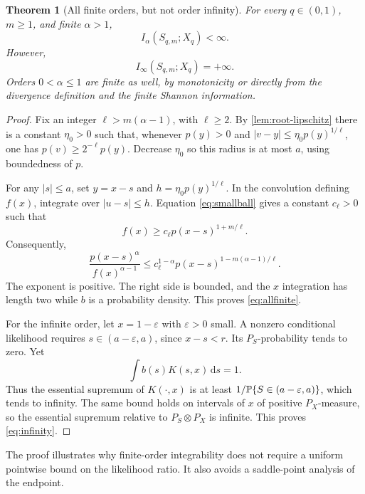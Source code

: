 \documentclass[11pt,a4paper]{article}
\numberwithin{equation}{section}
\newtheorem{theorem}{Theorem}[section]
\theoremstyle{definition}\newtheorem{definition}[theorem]{Definition}
\theoremstyle{remark}\newtheorem{remark}[theorem]{Remark}
\newcommand{\dd}{\,\mathrm d}\newcommand{\ii}{\mathrm i}
\begin{document}
\begin{theorem}[All finite orders, but not order infinity]
\label{thm:all-renyi}
For every $q\in(0,1)$, $m\ge1$, and finite $\alpha>1$,
\begin{equation}
 I_\alpha(S_{q,m};X_q)<\infty.
 \label{eq:allfinite}
\end{equation}
However,
\begin{equation}
 I_\infty(S_{q,m};X_q)=+\infty.
 \label{eq:infinity}
\end{equation}
Orders $0<\alpha\le1$ are finite as well, by monotonicity or directly from the divergence definition and the finite Shannon information.
\end{theorem}
\begin{proof}
Fix an integer $\ell>m(\alpha-1)$, with $\ell\ge2$. By \cref{lem:root-lipschitz} there is a constant $\eta_0>0$ such that, whenever $p(y)>0$ and
$|v-y|\le\eta_0p(y)^{1/\ell}$, one has $p(v)\ge2^{-\ell}p(y)$. Decrease $\eta_0$ so this radius is at most $a$, using boundedness of $p$.

For any $|s|\le a$, set $y=x-s$ and $h=\eta_0p(y)^{1/\ell}$. In the convolution defining $f(x)$, integrate over $|u-s|\le h$. Equation \eqref{eq:smallball} gives a constant $c_\ell>0$ such that
\begin{equation}
 f(x)\ge c_\ell p(x-s)^{1+m/\ell}.
 \label{eq:denominator-lower}
\end{equation}
Consequently,
\[
 \frac{p(x-s)^\alpha}{f(x)^{\alpha-1}}
 \le c_\ell^{1-\alpha}
 p(x-s)^{1-m(\alpha-1)/\ell}.
\]
The exponent is positive. The right side is bounded, and the $x$ integration has length two while $b$ is a probability density. This proves \eqref{eq:allfinite}.

For the infinite order, let $x=1-\varepsilon$ with $\varepsilon>0$ small. A nonzero conditional likelihood requires
$s\in(a-\varepsilon,a)$, since $x-s<r$. Its $P_S$-probability tends to zero. Yet
\[
 \int b(s)K(s,x)\dd s=1.
\]
Thus the essential supremum of $K(\cdot,x)$ is at least
$1/\mathbb P\{S\in(a-\varepsilon,a)\}$, which tends to infinity. The same bound holds on intervals of $x$ of positive $P_X$-measure, so the essential supremum relative to $P_S\otimes P_X$ is infinite. This proves \eqref{eq:infinity}.
\end{proof}
The proof illustrates why finite-order integrability does not require a uniform pointwise bound on the likelihood ratio. It also avoids a saddle-point analysis of the endpoint.
\end{document}
